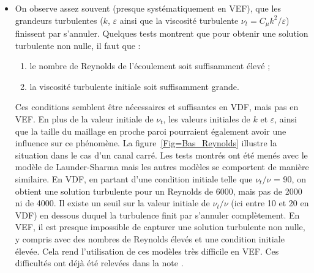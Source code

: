 \begin{itemize}
	\item On observe assez souvent (presque syst\'ematiquement en VEF), que les grandeurs turbulentes ($k$, $\varepsilon$ ainsi que la viscosit\'e turbulente $\nu_t=C_\mu k^2/\varepsilon$) finissent par s'annuler. Quelques tests montrent que pour obtenir une solution turbulente non nulle, il faut que :

	\begin{enumerate}
		\item le nombre de Reynolds de l'\'ecoulement soit suffisamment \'elev\'e ;
		\item la viscosit\'e turbulente initiale soit suffisamment grande.
	\end{enumerate}

Ces conditions semblent \^etre n\'ecessaires et suffisantes en VDF, mais pas en VEF. En plus de la valeur initiale de $\nu_t$, les valeurs initiales de $k$ et $\varepsilon$, ainsi que la taille du maillage en proche paroi pourraient \'egalement avoir une influence sur ce ph\'enom\`ene. La figure~\ref{Fig=Bas_Reynolds} illustre la situation dans le cas d'un canal carr\'e. Les tests montr\'es ont \'et\'e men\'es avec le mod\`ele de Launder-Sharma mais les autres mod\`eles se comportent de mani\`ere similaire. En VDF, en partant d'une condition initiale telle que $\nu_t/\nu$ = 90, on obtient une solution turbulente pour un Reynolds de 6000, mais pas de 2000 ni de 4000. Il existe un seuil sur la valeur initiale de $\nu_t/\nu$ (ici entre 10 et 20 en VDF) en dessous duquel la turbulence finit par s'annuler compl\`etement. En VEF, il est presque impossible de capturer une solution turbulente non nulle, y compris avec des nombres de Reynolds \'elev\'es et une condition initiale \'elev\'ee. Cela rend l'utilisation de ces mod\`eles tr\`es difficile en VEF. Ces difficult\'es ont d\'ej\`a \'et\'e relev\'ees dans la note \cite{Peybernes2016}.\medskip
 	 

\end{itemize}
